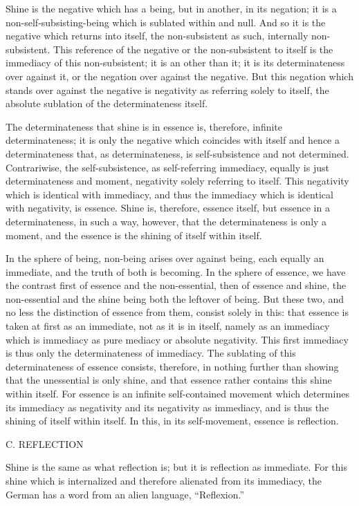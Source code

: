 Shine is the negative which has a being,
but in another, in its negation;
it is a non-self-subsisting-being
which is sublated within and null.
And so it is the negative which returns into itself,
the non-subsistent as such, internally non-subsistent.
This reference of the negative or
the non-subsistent to itself is
the immediacy of this non-subsistent;
it is an other than it;
it is its determinateness over against it,
or the negation over against the negative.
But this negation which stands over against the negative is
negativity as referring solely to itself,
the absolute sublation of the determinateness itself.

The determinateness that shine is in essence is,
therefore, infinite determinateness;
it is only the negative which coincides with itself
and hence a determinateness that, as determinateness,
is self-subsistence and not determined.
Contrariwise, the self-subsistence, as self-referring immediacy,
equally is just determinateness and moment,
negativity solely referring to itself.
This negativity which is identical with immediacy,
and thus the immediacy which is identical with negativity, is essence.
Shine is, therefore, essence itself,
but essence in a determinateness, in such a way, however,
that the determinateness is only a moment,
and the essence is the shining of itself within itself.

In the sphere of being, non-being arises over against being,
each equally an immediate, and the truth of both is becoming.
In the sphere of essence, we have the contrast
first of essence and the non-essential,
then of essence and shine,
the non-essential and the shine
being both the leftover of being.
But these two, and no less the
distinction of essence from them,
consist solely in this:
that essence is taken at first as an immediate,
not as it is in itself,
namely as an immediacy which is immediacy
as pure mediacy or absolute negativity.
This first immediacy is thus only the determinateness of immediacy.
The sublating of this determinateness of essence consists, therefore,
in nothing further than showing that the unessential is only shine,
and that essence rather contains this shine within itself.
For essence is an infinite self-contained movement
which determines its immediacy as negativity
and its negativity as immediacy,
and is thus the shining of itself within itself.
In this, in its self-movement,
essence is reflection.

C. REFLECTION

Shine is the same as what reflection is;
but it is reflection as immediate.
For this shine which is internalized
and therefore alienated from its immediacy,
the German has a word from an alien language, “Reflexion.”

